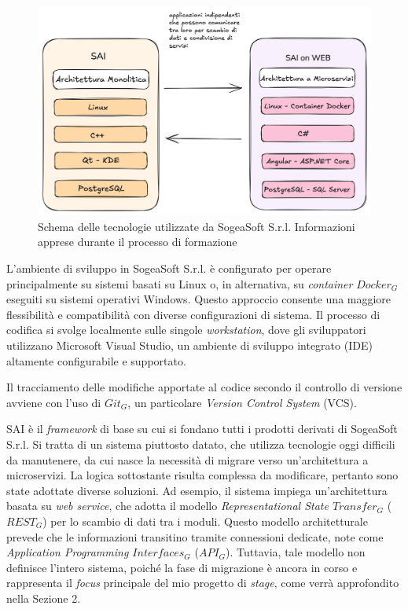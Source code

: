     \begin{figure}[H]
        \centering
        \includegraphics[width=0.8\linewidth]{BCS-Tessi/images/SAI_microservizi.png}
        \caption[Tecnologie utilizzate in SogeaSoft S.r.l.]{Schema delle tecnologie utilizzate da SogeaSoft S.r.l. Informazioni apprese durante il processo di formazione}
        \label{fig:Tecnologie}
    \end{figure}

    \noindent L'ambiente di sviluppo in SogeaSoft S.r.l. è configurato per operare principalmente su sistemi basati su Linux o, in alternativa, su \textit{container} $Docker_G$ eseguiti su sistemi operativi Windows. Questo approccio consente una maggiore flessibilità e compatibilità con diverse configurazioni di sistema. Il processo di codifica si svolge localmente sulle singole \textit{workstation}, dove gli sviluppatori utilizzano Microsoft Visual Studio, un ambiente di sviluppo integrato (IDE) altamente configurabile e supportato.

    \vspace{0.2 em}
    \noindent Il tracciamento delle modifiche apportate al codice secondo il controllo di versione avviene con l'uso di $Git_G$, un particolare \textit{Version Control System} (VCS). 

    \vspace{0.2 em}
    \noindent 
    SAI è il \textit{framework} di base su cui si fondano tutti i prodotti derivati di SogeaSoft S.r.l. Si tratta di un sistema piuttosto datato, che utilizza tecnologie oggi difficili da manutenere, da cui nasce la necessità di migrare verso un'architettura a microservizi. La logica sottostante risulta complessa da modificare, pertanto sono state adottate diverse soluzioni. Ad esempio, il sistema impiega un'architettura basata su \textit{web service}, che adotta il modello \textit{Representational State $Transfer_G$} ($REST_G$) per lo scambio di dati tra i moduli. Questo modello architetturale prevede che le informazioni transitino tramite connessioni dedicate, note come \textit{Application Programming $Interfaces_G$} ($API_G$). Tuttavia, tale modello non definisce l'intero sistema, poiché la fase di migrazione è ancora in corso e rappresenta il \textit{focus} principale del mio progetto di \textit{stage}, come verrà approfondito nella Sezione 2.
    
